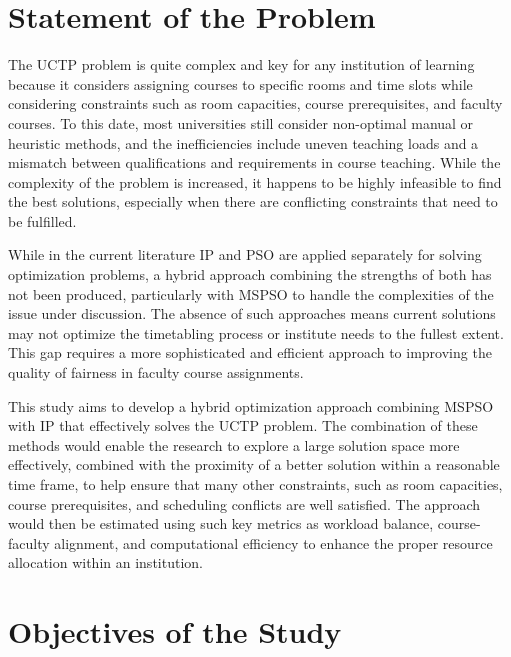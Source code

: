 \documentclass{article}
\begin{document}
\section{Statement of the Problem}
\label{sec:problemstatement}

The UCTP problem is quite complex and key for any institution of learning because it considers assigning courses to specific rooms and time slots while considering constraints such as room capacities, course prerequisites, and faculty courses. \cite{Arratia-Martinez2021-io} To this date, most universities still consider non-optimal manual or heuristic methods, and the inefficiencies include uneven teaching loads and a mismatch between qualifications and requirements in course teaching. \cite{Oswald_C2013-zo} While the complexity of the problem is increased, it happens to be highly infeasible to find the best solutions, especially when there are conflicting constraints that need to be fulfilled. 

While in the current literature IP\cite{Arratia-Martinez2021-io} \cite{Torres2021-ir}  and PSO \cite{Oswald_C2013-zo} \cite{Ali2014-mb} are applied separately for solving optimization problems, a hybrid approach combining the strengths of both has not been produced, particularly with MSPSO \cite{XIA2018126} to handle the complexities of the issue under discussion. The absence of such approaches means current solutions may not optimize the timetabling process or institute needs to the fullest extent. This gap requires a more sophisticated and efficient approach to improving the quality of fairness in faculty course assignments. 

This study aims to develop a hybrid optimization approach combining MSPSO with IP that effectively solves the UCTP problem. The combination of these methods would enable the research to explore a large solution space more effectively, combined with the proximity of a better solution within a reasonable time frame, to help ensure that many other constraints, such as room capacities, course prerequisites, and scheduling conflicts are well satisfied. The approach would then be estimated using such key metrics as workload balance, course-faculty alignment, and computational efficiency to enhance the proper resource allocation within an institution. 

\section{Objectives of the Study}
\label{sec:objectives}
\end{document}
